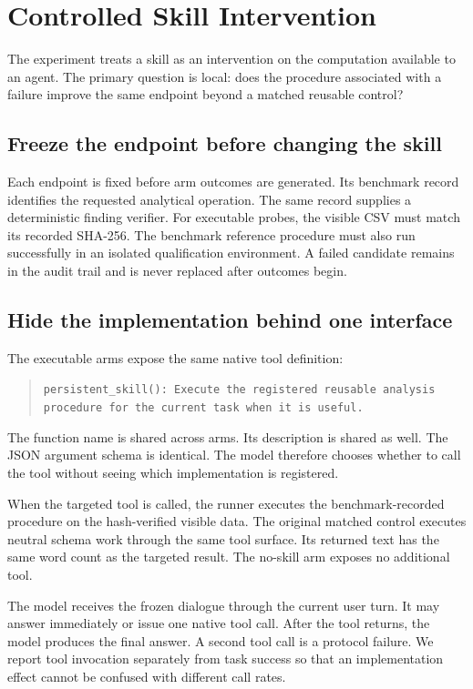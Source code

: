\section{Controlled Skill Intervention}
\label{sec:intervention}
The experiment treats a skill as an intervention on the computation available to an agent. The primary question is local: does the procedure associated with a failure improve the same endpoint beyond a matched reusable control?

\subsection{Freeze the endpoint before changing the skill}
Each endpoint is fixed before arm outcomes are generated. Its benchmark record identifies the requested analytical operation. The same record supplies a deterministic finding verifier. For executable probes, the visible CSV must match its recorded SHA-256. The benchmark reference procedure must also run successfully in an isolated qualification environment. A failed candidate remains in the audit trail and is never replaced after outcomes begin.

\subsection{Hide the implementation behind one interface}
The executable arms expose the same native tool definition:
\begin{quote}
\texttt{persistent\_skill(): Execute the registered reusable analysis procedure for the current task when it is useful.}
\end{quote}
The function name is shared across arms. Its description is shared as well. The JSON argument schema is identical. The model therefore chooses whether to call the tool without seeing which implementation is registered.

When the targeted tool is called, the runner executes the benchmark-recorded procedure on the hash-verified visible data. The original matched control executes neutral schema work through the same tool surface. Its returned text has the same word count as the targeted result. The no-skill arm exposes no additional tool.

The model receives the frozen dialogue through the current user turn. It may answer immediately or issue one native tool call. After the tool returns, the model produces the final answer. A second tool call is a protocol failure. We report tool invocation separately from task success so that an implementation effect cannot be confused with different call rates.

